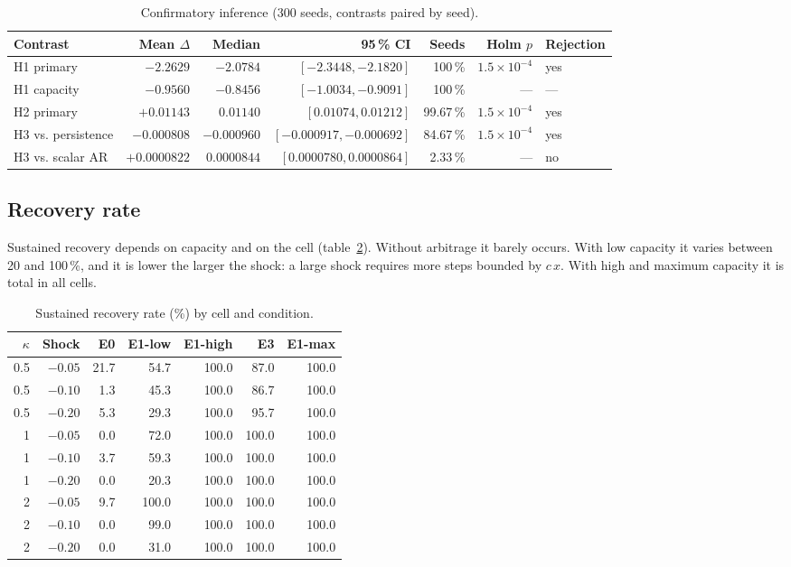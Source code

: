 \begin{table}[htbp]
\centering
\caption{Confirmatory inference (300 seeds, contrasts paired by seed).}
\label{tab:inferencia}
\small
\begin{tabular}{@{}lrrrrrl@{}}
\toprule
Contrast & Mean $\Delta$ & Median & 95\,\% CI & Seeds & Holm $p$ & Rejection \\
\midrule
H1 primary & $-2.2629$ & $-2.0784$ & $[-2.3448,-2.1820]$ & 100\,\% & $1.5\times10^{-4}$ & yes \\
H1 capacity & $-0.9560$ & $-0.8456$ & $[-1.0034,-0.9091]$ & 100\,\% & --- & --- \\
H2 primary & $+0.01143$ & $0.01140$ & $[0.01074,0.01212]$ & 99.67\,\% & $1.5\times10^{-4}$ & yes \\
H3 vs. persistence & $-0.000808$ & $-0.000960$ & $[-0.000917,-0.000692]$ & 84.67\,\% & $1.5\times10^{-4}$ & yes \\
H3 vs. scalar AR & $+0.0000822$ & $0.0000844$ & $[0.0000780,0.0000864]$ & 2.33\,\% & --- & no \\
\bottomrule
\end{tabular}
\end{table}

\subsection{Recovery rate}

Sustained recovery depends on capacity and on the cell (table~\ref{tab:recuperacion}). Without arbitrage it barely occurs. With low capacity it varies between 20 and 100\,\%, and it is lower the larger the shock: a large shock requires more steps bounded by $c\,x$. With high and maximum capacity it is total in all cells.

\begin{table}[htbp]
\centering
\caption{Sustained recovery rate (\%) by cell and condition.}
\label{tab:recuperacion}
\small
\begin{tabular}{@{}rrrrrrr@{}}
\toprule
$\kappa$ & Shock & E0 & E1-low & E1-high & E3 & E1-max \\
\midrule
0.5 & $-0.05$ & 21.7 & 54.7 & 100.0 & 87.0 & 100.0 \\
0.5 & $-0.10$ & 1.3 & 45.3 & 100.0 & 86.7 & 100.0 \\
0.5 & $-0.20$ & 5.3 & 29.3 & 100.0 & 95.7 & 100.0 \\
1 & $-0.05$ & 0.0 & 72.0 & 100.0 & 100.0 & 100.0 \\
1 & $-0.10$ & 3.7 & 59.3 & 100.0 & 100.0 & 100.0 \\
1 & $-0.20$ & 0.0 & 20.3 & 100.0 & 100.0 & 100.0 \\
2 & $-0.05$ & 9.7 & 100.0 & 100.0 & 100.0 & 100.0 \\
2 & $-0.10$ & 0.0 & 99.0 & 100.0 & 100.0 & 100.0 \\
2 & $-0.20$ & 0.0 & 31.0 & 100.0 & 100.0 & 100.0 \\
\bottomrule
\end{tabular}
\end{table}


